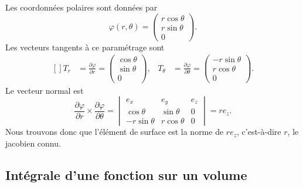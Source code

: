 \begin{example}
	Les coordonnées polaires sont données par
	\begin{equation}
		\varphi(r,\theta)=\begin{pmatrix}
			r\cos\theta \\
			r\sin\theta \\
			0
		\end{pmatrix}.
	\end{equation}
	Les vecteurs tangents à ce paramétrage sont
	\begin{equation}
		\begin{aligned}[]
			T_r & =\frac{ \partial \varphi }{ \partial r }=\begin{pmatrix}
				\cos\theta \\
				\sin\theta \\
				0
			\end{pmatrix}, & T_{\theta} & =\frac{ \partial \varphi }{ \partial \theta }=\begin{pmatrix}
				-r\sin\theta \\
				r\cos\theta  \\
				0
			\end{pmatrix}.
		\end{aligned}
	\end{equation}
	Le vecteur normal est
	\begin{equation}
		\frac{ \partial \varphi }{ \partial r }\times\frac{ \partial \varphi }{ \partial \theta }=\begin{vmatrix}
			e_x          & e_y         & e_z \\
			\cos\theta   & \sin\theta  & 0   \\
			-r\sin\theta & r\cos\theta & 0
		\end{vmatrix}=re_z.
	\end{equation}
	Nous trouvons donc que l'élément de surface est la norme de \( re_z\), c'est-à-dire \( r\), le jacobien connu.
\end{example}

\subsection{Intégrale d'une fonction sur un volume}

